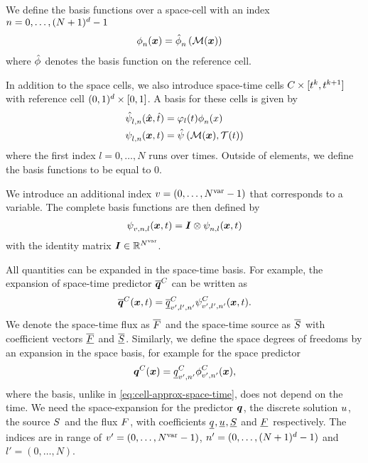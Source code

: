We define the basis functions over a space-cell with an index $n = 0, \ldots, (N+1)^d - 1$
\begin{align}\label{eq:space-basis}
  \begin{split}
  \sbasis[][n] (\bm{x}) &= \sbasisRef[][n] \left( \mapping(\bm{x}) \right)
  \end{split}
\end{align}
where $\sbasisRef$ denotes the basis function on the reference cell.

In addition to the space cells, we also introduce space-time cells $C_{} \times [t^k, t^{k+1}]$ with reference cell $(0,1)^d \times  [0,1]$.
A basis for these cells is given by
\begin{align}\label{eq:space-time-basis}
  \begin{split}
  \stbasisRef[][l,n](\hat{\bm{x}}, \hat{t}) &= \lagrange[l](t) \sbasis[][n] (x)\\
  \stbasis[][l,n] (\bm{x}, t) &= \stbasisRef \left( \mapping(\bm{x}), \timeMapping(t) \right)
  \end{split}
\end{align}
where the first index $l = 0, \ldots, N$ runs over times.
Outside of elements, we define the basis functions to be equal to 0.

We introduce an additional index $v = (0, \ldots, N^{\text{var}} - 1)$ that corresponds to a variable.
The complete basis functions are then defined by
\begin{align}
  \stbasis[][v,n,l] (\bm{x},t)= \bm{I} \otimes \stbasis[][n,l] (\bm{x}, t)
\end{align}
with the identity matrix $\bm{I} \in \mathbb{R}^{N^{\text{var}}}$.

All quantities can be expanded in the space-time basis.
For example, the expansion of space-time predictor $\stpredictor[\cell]$ can be written as
\begin{equation}
  \label{eq:cell-approx-space-time}
  \stpredictor[\cell] (\bm{x}, t) = \stpredictorCoeff[\cell][v',l',n'] \stbasis[\cell][v',l',n'](\bm{x}, t).
\end{equation}
We denote the space-time flux as $\stflux$ and the space-time source as $\stsource$ with coefficient vectors $\stfluxCoeff$ and $\stsourceCoeff$.
Similarly, we define the space degrees of freedoms by an expansion in the space basis, for example for the space predictor
\begin{equation}
  \label{eq:cell-approx-space}
  \spredictor[\cell] (\bm{x}) = \spredictorCoeff[\cell][v',n'] \sbasis[\cell][v',n'] (\bm{x}),
\end{equation}
where the basis, unlike in \cref{eq:cell-approx-space-time}, does not depend on the time.
We need the space-expansion for the predictor $\spredictor$, the discrete solution $\ssol$, the source $\ssource$ and the flux $\sflux$,
with coefficients $\spredictorCoeff, \ssolCoeff, \ssourceCoeff$ and $\sfluxCoeff$ respectively.
The indices are in range of $v' = (0, \ldots, N^{\text{var}} - 1)$, $n' = (0, \ldots, (N+1)^d - 1)$ and $l' = ( 0, \ldots, N)$.

